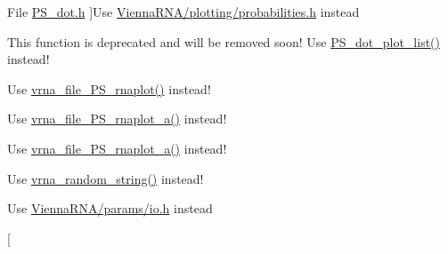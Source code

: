\begin{DoxyRefList}
File \hyperlink{PS__dot_8h}{P\+S\+\_\+dot.h} ]Use \hyperlink{probabilities_8h}{Vienna\+R\+N\+A/plotting/probabilities.\+h} instead  
\item[\label{deprecated__deprecated000159}%
\Hypertarget{deprecated__deprecated000159}%
Global \hyperlink{group__plotting__utils_ga689a97a7e3b8a2df14728b8204d9d57b}{P\+S\+\_\+dot\+\_\+plot} (char $\ast$string, char $\ast$file)]This function is deprecated and will be removed soon! Use \hyperlink{group__plotting__utils_ga00ea223b5cf02eb2faae5ff29f0d5e12}{P\+S\+\_\+dot\+\_\+plot\+\_\+list()} instead!  
\item[\label{deprecated__deprecated000160}%
\Hypertarget{deprecated__deprecated000160}%
Global \hyperlink{group__plotting__utils_ga0873c7cc4cd7a11c9a2cea19dde7e9c9}{P\+S\+\_\+rna\+\_\+plot} (char $\ast$string, char $\ast$structure, char $\ast$file)]Use \hyperlink{group__plotting__utils_gabdc8f6548ba4a3bc3cd868ccbcfdb86a}{vrna\+\_\+file\+\_\+\+P\+S\+\_\+rnaplot()} instead!  
\item[\label{deprecated__deprecated000161}%
\Hypertarget{deprecated__deprecated000161}%
Global \hyperlink{group__plotting__utils_ga47856b2504b566588785597b6ebb8271}{P\+S\+\_\+rna\+\_\+plot\+\_\+a} (char $\ast$string, char $\ast$structure, char $\ast$file, char $\ast$pre, char $\ast$post)]Use \hyperlink{group__plotting__utils_ga139a31dd0ba9fc6612431f67de901c31}{vrna\+\_\+file\+\_\+\+P\+S\+\_\+rnaplot\+\_\+a()} instead!  
\item[\label{deprecated__deprecated000162}%
\Hypertarget{deprecated__deprecated000162}%
Global \hyperlink{group__plotting__utils_ga32fa0f97625119e9d24dd2e7153abc4f}{P\+S\+\_\+rna\+\_\+plot\+\_\+a\+\_\+gquad} (char $\ast$string, char $\ast$structure, char $\ast$ssfile, char $\ast$pre, char $\ast$post)]Use \hyperlink{group__plotting__utils_ga139a31dd0ba9fc6612431f67de901c31}{vrna\+\_\+file\+\_\+\+P\+S\+\_\+rnaplot\+\_\+a()} instead!  
\item[\label{deprecated__deprecated000179}%
\Hypertarget{deprecated__deprecated000179}%
Global \hyperlink{strings_8h_a1b95eac365a021572e1c37e5993a89be}{random\+\_\+string} (int l, const char symbols\mbox{[}\mbox{]})]Use \hyperlink{group__string__utils_ga4eeb3750dcf860b9f3158249f95dbd7f}{vrna\+\_\+random\+\_\+string()} instead!  
\item[\label{deprecated__deprecated000125}%
\Hypertarget{deprecated__deprecated000125}%
File \hyperlink{read__epars_8h}{read\+\_\+epars.h} ]Use \hyperlink{io_8h}{Vienna\+R\+N\+A/params/io.\+h} instead  
\item[\label{deprecated__deprecated000158}%

\end{DoxyRefList}
